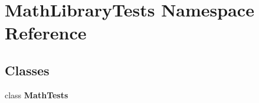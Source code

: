 \section{Math\+Library\+Tests Namespace Reference}
\label{namespace_math_library_tests}
\subsection*{Classes}
\begin{DoxyCompactItemize}
\item 
class \textbf{ Math\+Tests}
\end{DoxyCompactItemize}
